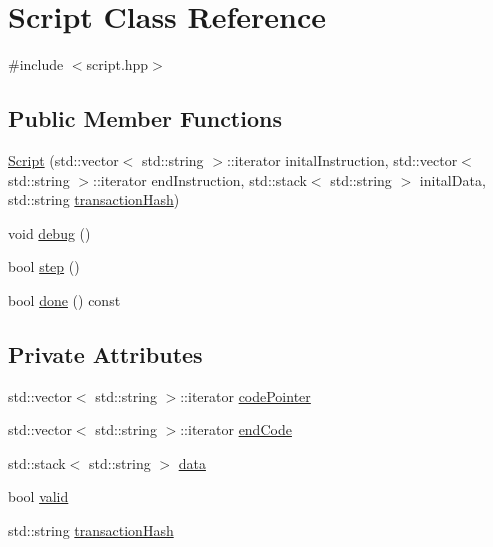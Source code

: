 \hypertarget{classScript}{}\section{Script Class Reference}
\label{classScript}


{\ttfamily \#include $<$script.\+hpp$>$}

\subsection*{Public Member Functions}
\begin{DoxyCompactItemize}
\item 
\mbox{\hyperlink{classScript_ac5dfef3a38ce09aa3d664b041b4b47e1}{Script}} (std\+::vector$<$ std\+::string $>$\+::iterator inital\+Instruction, std\+::vector$<$ std\+::string $>$\+::iterator end\+Instruction, std\+::stack$<$ std\+::string $>$ inital\+Data, std\+::string \mbox{\hyperlink{classScript_a483186fc03c980f1db03cc185ea51785}{transaction\+Hash}})
\item 
void \mbox{\hyperlink{classScript_aeabf9b6665b69309c6e825606d19202d}{debug}} ()
\item 
bool \mbox{\hyperlink{classScript_a8491a3c9b5e51e2bf9c0b6f9bf13f6e9}{step}} ()
\item 
bool \mbox{\hyperlink{classScript_ab5fb80fb997e4d8172dd418037a7bc0b}{done}} () const
\end{DoxyCompactItemize}
\subsection*{Private Attributes}
\begin{DoxyCompactItemize}
\item 
std\+::vector$<$ std\+::string $>$\+::iterator \mbox{\hyperlink{classScript_ad5811f724787c30487d0af0948015a11}{code\+Pointer}}
\item 
std\+::vector$<$ std\+::string $>$\+::iterator \mbox{\hyperlink{classScript_abb86519c47bd35608747511fdfdcccfc}{end\+Code}}
\item 
std\+::stack$<$ std\+::string $>$ \mbox{\hyperlink{classScript_a30e43a826a3f24edc5165535de541b6b}{data}}
\item 
bool \mbox{\hyperlink{classScript_a2754a6aa74c68bd58271955e157ce73a}{valid}}
\item 
std\+::string \mbox{\hyperlink{classScript_a483186fc03c980f1db03cc185ea51785}{transaction\+Hash}}
\end{DoxyCompactItemize}


